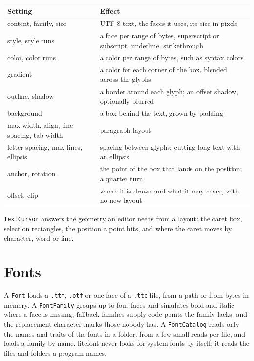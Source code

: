 \documentclass[11pt]{article}
\begin{document}
\begin{center}
\small
\begin{tabularx}{\textwidth}{@{}lX@{}}
\toprule
Setting & Effect \\
\midrule
content, family, size & UTF-8 text, the faces it uses, its size in pixels \\
style, style runs & a face per range of bytes, superscript or subscript, underline, strikethrough \\
color, color runs & a color per range of bytes, such as syntax colors \\
gradient & a color for each corner of the box, blended across the glyphs \\
outline, shadow & a border around each glyph; an offset shadow, optionally blurred \\
background & a box behind the text, grown by padding \\
max width, align, line spacing, tab width & paragraph layout \\
letter spacing, max lines, ellipsis & spacing between glyphs; cutting long text with an ellipsis \\
anchor, rotation & the point of the box that lands on the position; a quarter turn \\
offset, clip & where it is drawn and what it may cover, with no new layout \\
\bottomrule
\end{tabularx}
\end{center}

\texttt{TextCursor} answers the geometry an editor needs from a layout: the caret box, selection rectangles, the position a point hits, and where the caret moves by character, word or line.

\section{Fonts}

A \texttt{Font} loads a \texttt{.ttf}, \texttt{.otf} or one face of a \texttt{.ttc} file, from a path or from bytes in memory. A \texttt{FontFamily} groups up to four faces and simulates bold and italic where a face is missing; fallback families supply code points the family lacks, and the replacement character marks those nobody has. A \texttt{FontCatalog} reads only the names and traits of the fonts in a folder, from a few small reads per file, and loads a family by name. litefont never looks for system fonts by itself: it reads the files and folders a program names.
\end{document}
